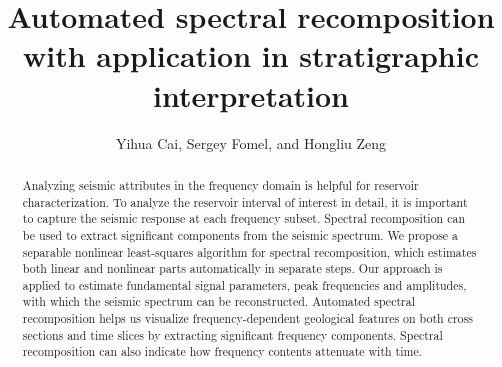 
%
\title{Automated spectral recomposition with application in stratigraphic interpretation}
\renewcommand{\thefootnote}{\fnsymbol{footnote}}
\address{
\footnotemark[1]Currently Shell EPCO\\
200 N Dairy Ashford Rd\\
Houston, TX 77079-1101\\
\footnotemark[2]Bureau of Economic Geology\\
Jackson School of Geosciences\\
The University of Texas at Austin \\
Austin, TX 78713-8924}
\author{Yihua Cai\footnotemark[1]\footnotemark[2], Sergey Fomel\footnotemark[2], and Hongliu Zeng\footnotemark[2]}
\renewcommand{\thefootnote}{\fnsymbol{footnote}} 

\maketitle
\begin{abstract}
Analyzing seismic attributes in the frequency domain is helpful for reservoir characterization. To analyze the reservoir interval of interest in detail, it is important to capture the seismic response at each frequency subset. Spectral recomposition can be used to extract significant components from the seismic spectrum. We propose a separable nonlinear least-squares algorithm for spectral recomposition, which estimates both linear and nonlinear parts automatically in separate steps. Our approach is applied to estimate fundamental signal parameters, peak frequencies and amplitudes, with which the seismic spectrum can be reconstructed. Automated spectral recomposition helps us visualize frequency-dependent geological features on both cross sections and time slices by extracting significant frequency components. Spectral recomposition can also indicate how frequency contents attenuate with time.
\end{abstract}
